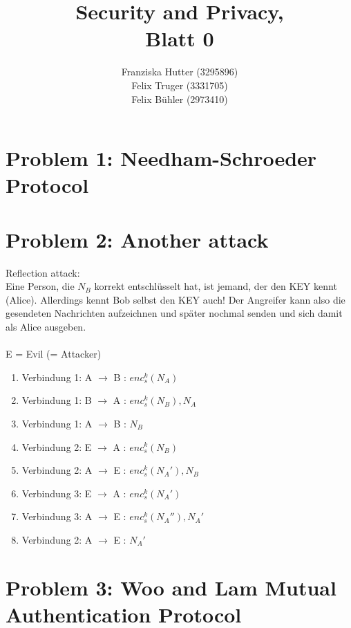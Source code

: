 \documentclass[12pt,pdftex,a4paper]{article}
\title{Security and Privacy,\\ Blatt 0}
\author{Franziska Hutter (3295896)\\
	Felix Truger (3331705)\\
	Felix Bühler (2973410)}
\newcommand\tab[1][1cm]{\hspace*{#1}}
\begin{document}
\maketitle
\pagebreak

\section*{Problem 1: Needham-Schroeder Protocol}

\section*{Problem 2: Another attack}
Reflection attack:\\
Eine Person, die $ N_B $ korrekt entschlüsselt hat, ist jemand, der den KEY kennt (Alice). Allerdings kennt Bob selbst den KEY auch! Der Angreifer kann also die gesendeten Nachrichten aufzeichnen und später nochmal senden und sich damit als Alice ausgeben.
\\~\\
E = Evil (= Attacker)
\begin{enumerate}
	\item Verbindung 1: A $ \rightarrow $ B \tab : $ enc_s^k(N_A) $
	\item Verbindung 1: B $ \rightarrow $ A \tab : $ enc_s^k(N_B), N_A $
	\item Verbindung 1: A $ \rightarrow $ B \tab : $ N_B $
	\setlength{\itemsep}{20pt}
	\item Verbindung 2: E $ \rightarrow $ A \tab : $ enc_s^k(N_B) $
	\setlength{\itemsep}{5pt}
	\item Verbindung 2: A $ \rightarrow $ E \tab : $ enc_s^k(N_A'), N_B $
	\item Verbindung 3: E $ \rightarrow $ A \tab : $ enc_s^k(N_A') $
	\item Verbindung 3: A $ \rightarrow $ E \tab : $ enc_s^k(N_A''), N_A' $
	\item Verbindung 2: A $ \rightarrow $ E \tab : $ N_A' $
\end{enumerate}
\section*{Problem 3: Woo and Lam Mutual Authentication Protocol}
\end{document}
